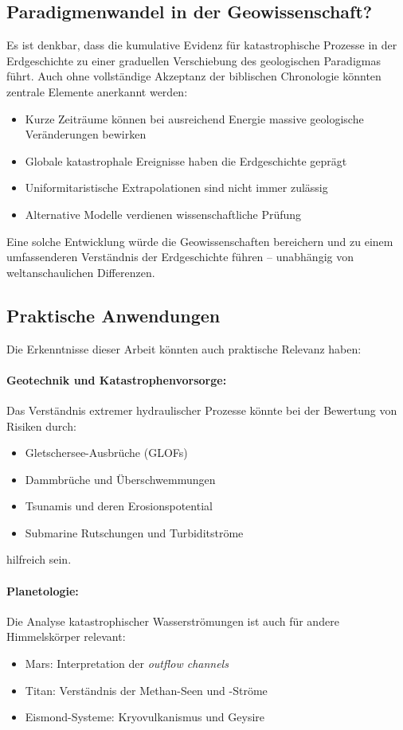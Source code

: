 ﻿\documentclass[12pt,a4paper]{report}
\begin{document}
\subsection{Paradigmenwandel in der Geowissenschaft?}

Es ist denkbar, dass die kumulative Evidenz für katastrophische Prozesse in der Erdgeschichte zu einer graduellen Verschiebung des geologischen Paradigmas führt. Auch ohne vollständige Akzeptanz der biblischen Chronologie könnten zentrale Elemente anerkannt werden:

\begin{itemize}
	\item Kurze Zeiträume können bei ausreichend Energie massive geologische Veränderungen bewirken
	\item Globale katastrophale Ereignisse haben die Erdgeschichte geprägt
	\item Uniformitaristische Extrapolationen sind nicht immer zulässig
	\item Alternative Modelle verdienen wissenschaftliche Prüfung
\end{itemize}

Eine solche Entwicklung würde die Geowissenschaften bereichern und zu einem umfassenderen Verständnis der Erdgeschichte führen -- unabhängig von weltanschaulichen Differenzen.

\subsection{Praktische Anwendungen}

Die Erkenntnisse dieser Arbeit könnten auch praktische Relevanz haben:

\paragraph{Geotechnik und Katastrophenvorsorge:}
Das Verständnis extremer hydraulischer Prozesse könnte bei der Bewertung von Risiken durch:
\begin{itemize}
	\item Gletschersee-Ausbrüche (GLOFs)
	\item Dammbrüche und Überschwemmungen
	\item Tsunamis und deren Erosionspotential
	\item Submarine Rutschungen und Turbiditströme
\end{itemize}
hilfreich sein.

\paragraph{Planetologie:}
Die Analyse katastrophischer Wasserströmungen ist auch für andere Himmelskörper relevant:
\begin{itemize}
	\item Mars: Interpretation der \textit{outflow channels}
	\item Titan: Verständnis der Methan-Seen und -Ströme
	\item Eismond-Systeme: Kryovulkanismus und Geysire
\end{itemize}
\end{document}

